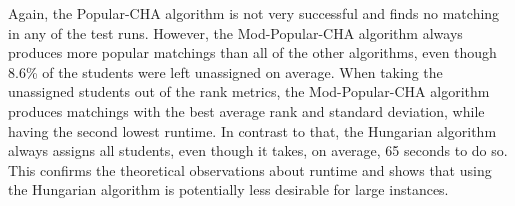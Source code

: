 \begin{table}[h!]
  \centering
  \caption{Average results for large Zipfian dataset (2500 Students) with 10 runs}
  \label{tab:results-zipfian-medium}
\end{table}

Again, the Popular-CHA algorithm is not very successful and finds no matching in any of the test runs. However, the Mod-Popular-CHA algorithm always produces more popular matchings than all of the other algorithms, even though 8.6\% of the students were left unassigned on average. When taking the unassigned students out of the rank metrics, the Mod-Popular-CHA algorithm produces matchings with the best average rank and standard deviation, while having the second lowest runtime. In contrast to that, the Hungarian algorithm always assigns all students, even though it takes, on average, 65 seconds to do so. This confirms the theoretical observations about runtime and shows that using the Hungarian algorithm is potentially less desirable for large instances.

